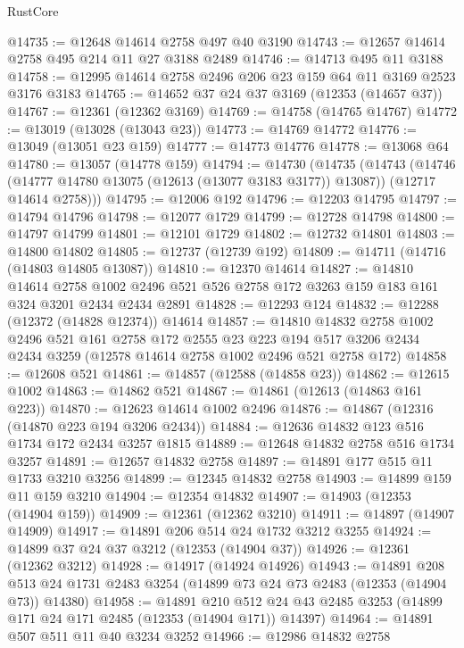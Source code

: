 \begin{lexlean}{RustCore}
\begin{coremodule}
@14735 := @12648 @14614 @2758 @497 @40 @3190
@14743 := @12657 @14614 @2758 @495 @214 @11 @27 @3188 @2489
@14746 := @14713 @495 @11 @3188
@14758 := @12995 @14614 @2758 @2496 @206 @23 @159 @64 @11 @3169 @2523 @3176 @3183
@14765 := @14652 @37 @24 @37 @3169 (@12353 (@14657 @37))
@14767 := @12361 (@12362 @3169)
@14769 := @14758 (@14765 @14767)
@14772 := @13019 (@13028 (@13043 @23))
@14773 := @14769 @14772
@14776 := @13049 (@13051 @23 @159)
@14777 := @14773 @14776
@14778 := @13068 @64
@14780 := @13057 (@14778 @159)
@14794 := @14730
    (@14735
      (@14743
        (@14746 (@14777 @14780 @13075 (@12613 (@13077 @3183 @3177)) @13087))
        (@12717 @14614 @2758)))
@14795 := @12006 @192
@14796 := @12203 @14795
@14797 := @14794 @14796
@14798 := @12077 @1729
@14799 := @12728 @14798
@14800 := @14797 @14799
@14801 := @12101 @1729
@14802 := @12732 @14801
@14803 := @14800 @14802
@14805 := @12737 (@12739 @192)
@14809 := @14711 (@14716 (@14803 @14805 @13087))
@14810 := @12370 @14614
@14827 := @14810
    @14614
    @2758
    @1002
    @2496
    @521
    @526
    @2758
    @172
    @3263
    @159
    @183
    @161
    @324
    @3201
    @2434
    @2434
    @2891
@14828 := @12293 @124
@14832 := @12288 (@12372 (@14828 @12374)) @14614
@14857 := @14810
    @14832
    @2758
    @1002
    @2496
    @521
    @161
    @2758
    @172
    @2555
    @23
    @223
    @194
    @517
    @3206
    @2434
    @2434
    @3259
    (@12578 @14614 @2758 @1002 @2496 @521 @2758 @172)
@14858 := @12608 @521
@14861 := @14857 (@12588 (@14858 @23))
@14862 := @12615 @1002
@14863 := @14862 @521
@14867 := @14861 (@12613 (@14863 @161 @223))
@14870 := @12623 @14614 @1002 @2496
@14876 := @14867 (@12316 (@14870 @223 @194 @3206 @2434))
@14884 := @12636 @14832 @123 @516 @1734 @172 @2434 @3257 @1815
@14889 := @12648 @14832 @2758 @516 @1734 @3257
@14891 := @12657 @14832 @2758
@14897 := @14891 @177 @515 @11 @1733 @3210 @3256
@14899 := @12345 @14832 @2758
@14903 := @14899 @159 @11 @159 @3210
@14904 := @12354 @14832
@14907 := @14903 (@12353 (@14904 @159))
@14909 := @12361 (@12362 @3210)
@14911 := @14897 (@14907 @14909)
@14917 := @14891 @206 @514 @24 @1732 @3212 @3255
@14924 := @14899 @37 @24 @37 @3212 (@12353 (@14904 @37))
@14926 := @12361 (@12362 @3212)
@14928 := @14917 (@14924 @14926)
@14943 := @14891
    @208
    @513
    @24
    @1731
    @2483
    @3254
    (@14899 @73 @24 @73 @2483 (@12353 (@14904 @73)) @14380)
@14958 := @14891
    @210
    @512
    @24
    @43
    @2485
    @3253
    (@14899 @171 @24 @171 @2485 (@12353 (@14904 @171)) @14397)
@14964 := @14891 @507 @511 @11 @40 @3234 @3252
@14966 := @12986 @14832 @2758

\end{coremodule}
\end{lexlean}
